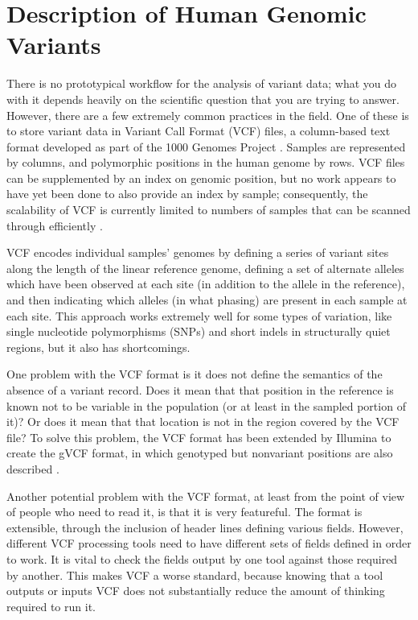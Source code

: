 \documentclass[11pt,proposal]{ucthesis}
\begin{document}
    
\section{Description of Human Genomic Variants}

There is no prototypical workflow for the analysis of variant data; what you do with it depends heavily on the scientific question that you are trying to answer. However, there are a few extremely common practices in the field. One of these is to store variant data in Variant Call Format (VCF) files, a column-based text format developed as part of the 1000 Genomes Project \cite{danecek2011variant}. Samples are represented by columns, and polymorphic positions in the human genome by rows. VCF files can be supplemented by an index on genomic position, but no work appears to have yet been done to also provide an index by sample; consequently, the scalability of VCF is currently limited to numbers of samples that can be scanned through efficiently \cite{danecek2011variant}.

VCF encodes individual samples' genomes by defining a series of variant sites along the length of the linear reference genome, defining a set of alternate alleles which have been observed at each site (in addition to the allele in the reference), and then indicating which alleles (in what phasing) are present in each sample at each site. This approach works extremely well for some types of variation, like single nucleotide polymorphisms (SNPs) and short indels in structurally quiet regions, but it also has shortcomings.

One problem with the VCF format is it does not define the semantics of the absence of a variant record. Does it mean that that position in the reference is known not to be variable in the population (or at least in the sampled portion of it)? Or does it mean that that location is not in the region covered by the VCF file? To solve this problem, the VCF format has been extended by Illumina to create the gVCF format, in which genotyped but nonvariant positions are also described \cite{saunders2014about}.

Another potential problem with the VCF format, at least from the point of view of people who need to read it, is that it is very featureful. The format is extensible, through the inclusion of header lines defining various fields. However, different VCF processing tools need to have different sets of fields defined in order to work. It is vital to check the fields output by one tool against those required by another. This makes VCF a worse standard, because knowing that a tool outputs or inputs VCF does not substantially reduce the amount of thinking required to run it.
\end{document}
